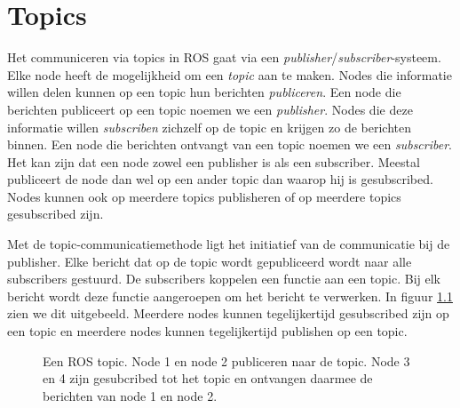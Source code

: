 \chapter{Topics}
\label{chp:topics}
Het communiceren via topics in ROS gaat via een \textit{publisher}/\textit{subscriber}-systeem. Elke node heeft de mogelijkheid om een \textit{topic} aan te maken. Nodes die informatie willen delen kunnen op een topic hun berichten \textit{publiceren}. Een node die berichten publiceert op een topic noemen we een \textit{publisher}. Nodes die deze informatie willen \textit{subscriben} zichzelf op de topic en krijgen zo de berichten binnen. Een node die berichten ontvangt van een topic noemen we een \textit{subscriber}. Het kan zijn dat een node zowel een publisher is als een subscriber. Meestal publiceert de node dan wel op een ander topic dan waarop hij is gesubscribed. Nodes kunnen ook op meerdere topics publisheren of op meerdere topics gesubscribed zijn.

Met de topic-communicatiemethode ligt het initiatief van de communicatie bij de publisher. Elke bericht dat op de topic wordt gepubliceerd wordt naar alle subscribers gestuurd. De subscribers koppelen een functie aan een topic. Bij elk bericht wordt deze functie aangeroepen om het bericht te verwerken. In figuur \ref{fig:topics} zien we dit uitgebeeld. Meerdere nodes kunnen tegelijkertijd gesubscribed zijn op een topic en meerdere nodes kunnen tegelijkertijd publishen op een topic.

\begin{figure}[h] %
\centering %
\caption{Een ROS topic. Node 1 en node 2 publiceren naar de topic. Node 3 en 4 zijn gesubcribed tot het topic en ontvangen daarmee de berichten van node 1 en node 2.}
\label{fig:topics}
\end{figure}

